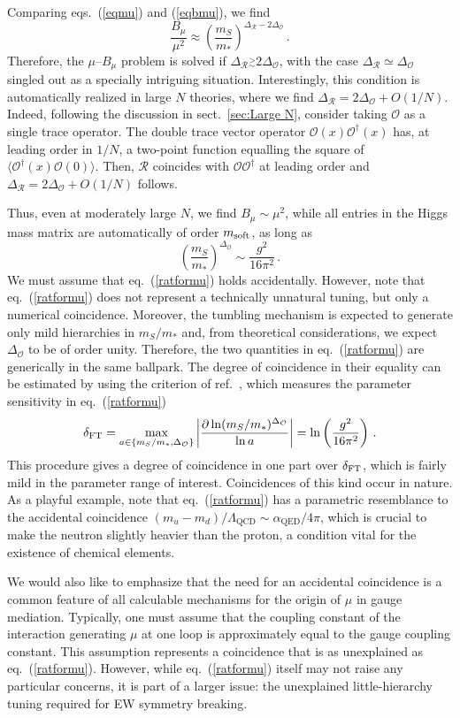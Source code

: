 \documentclass[a4paper,12pt]{article}
\newcommand{\gsim}{\stackrel{>}{_\sim}}
\newcommand{\beq}{\begin{equation}}
\newcommand{\eeq}{\end{equation}}
\def\eq#1{eq.~(\ref{#1})}
\def\eq#1{eq.~(\ref{#1})}
\def\sec#1{sect.~\ref{#1}}
\def\O{\mathcal{O}}
\def\R{\mathcal{R}}
\def\mst{m_*}
\def\mS{m_S}
\def\msoft{m_{\rm soft}}
\begin{document}
Comparing eqs.~(\ref{eqmu}) and (\ref{eqbmu}), we find
\beq
\frac{B_\mu }{ \mu^2} \approx \left(\frac{\mS}{\mst}\right)^{\Delta_\R-2\Delta_\O}\, . 
\label{eccobbmu}
\eeq
Therefore, the $\mu$--$B_\mu$ problem is solved if $\Delta_\R \gsim 2\Delta_\O$, with the case $\Delta_\R \simeq \Delta_\O$ singled out
as a specially intriguing situation. Interestingly, this condition is automatically realized in large $N$ theories, where we find $\Delta_\R = 2 \Delta_\O + O(1/N)$. Indeed, following the discussion in \sec{sec:Large N}, consider taking $\O$ as a single trace operator. The double trace vector operator $\O(x)\O^\dagger(x)$ has,  at leading order in $1/N$, a two-point function equalling the square of $\langle \O^\dagger (x)\O(0)\rangle$. Then, $\R$ coincides with $\O\O^\dagger$ at leading order and  $\Delta_\R = 2 \Delta_\O + O(1/N)$ follows.

Thus, even at moderately large $N$, we find $B_\mu \sim \mu^2$, while all entries in the Higgs mass matrix are automatically of order $\msoft$, as long as
\beq
\left(\frac{\mS}{\mst}\right)^{\Delta_\O} \sim \frac{g^2}{16 \pi^2}\, .
\label{ratformu}
\eeq
We must assume that \eq{ratformu}  holds accidentally. However, note that  \eq{ratformu} does not represent a technically unnatural tuning, but only a numerical coincidence. Moreover, the tumbling mechanism is expected to generate only mild hierarchies in $\mS/\mst$ and, from theoretical considerations, we expect $\Delta_\O$ to be of order unity. Therefore, the two quantities in \eq{ratformu} are generically in the same ballpark. The degree of coincidence in their equality can be estimated by using the criterion of ref.~\cite{Barbieri:1987fn}, which measures the parameter sensitivity in \eq{ratformu}
\beq
\delta_{\rm FT}=\max_{a\in\{\mS/\mst,\Delta_\O\}} \left| \frac{\partial \ln (\mS/\mst)^{\Delta_\O}}{\ln a}\right|=\ln \left( \frac{g^2}{16 \pi^2}\right) \, .
\eeq
This procedure gives a degree of coincidence in one part over $\delta_{\rm FT}$, which is fairly mild in the parameter range of interest. Coincidences of this kind occur in nature. As a playful example, note that \eq{ratformu} has a parametric resemblance to the accidental coincidence $(m_u-m_d)/\Lambda_{\textrm{QCD}}\sim \alpha_{\textrm{QED}}/4\pi$, which is crucial to make the neutron slightly heavier than the proton, a condition vital for the existence of chemical elements.

We would also like to emphasize that the need for an accidental coincidence is a common feature of all calculable mechanisms for the origin of  $\mu$ in gauge mediation.  Typically, one must assume that the coupling constant of the interaction generating $\mu$ at one loop is approximately equal to the gauge coupling constant. This assumption represents a coincidence that is as unexplained as \eq{ratformu}. However, while \eq{ratformu} itself may not raise any particular concerns, it is part of a larger issue: the unexplained little-hierarchy tuning required for EW symmetry breaking.
\end{document}
